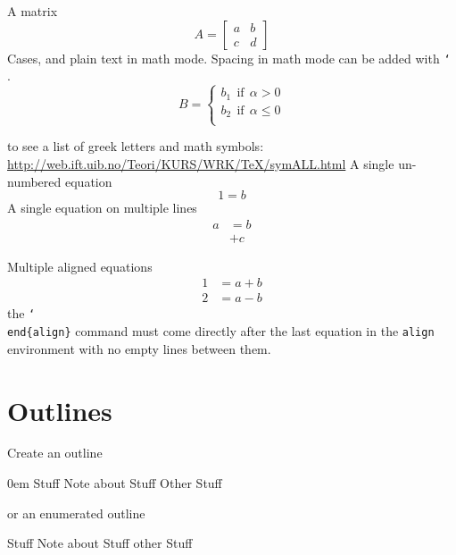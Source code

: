 \documentclass[12pt]{article}
\begin{document}
A matrix
\begin{equation}
	A = 
\begin{bmatrix}
	a & b \\
	c & d
\end{bmatrix}
\end{equation}
Cases, and plain text in math mode.  Spacing in math mode can be added with \texttt{\char`\\ }.  
\begin{equation}\label{eq:cases}
	B = 
	\begin{cases}
		b_1 \ \ \text{if} \ \ \alpha > 0 \\
		b_2 \ \ \text{if} \ \ \alpha \leq 0 \\
	\end{cases}
\end{equation}



to see a list of greek letters and math symbols: \url{http://web.ift.uib.no/Teori/KURS/WRK/TeX/symALL.html}
A single un-numbered equation
\begin{equation*}
	1 = b 
\end{equation*}
A single equation on multiple lines
\begin{equation}\begin{split}\label{eq:spliteqn}
	a &= b \\
	  &+ c
\end{split}\end{equation}

Multiple aligned equations
\begin{align}
	1 &= a + b \\
	2 &= a - b
\end{align}
the \texttt{\char`\\end\{align\}} command must come directly after the last equation in the \texttt{align} environment with no empty lines between them.  



	\section{Outlines}
Create an outline
\begin{outline}
\itemsep0em
	\1 Stuff
		\2 Note about Stuff
	\1 Other Stuff
\end{outline}
or an enumerated outline
\begin{outline}[enumerate]
	\1 Stuff
		\2 Note about Stuff
	\1 other Stuff
\end{outline}
\end{document}
